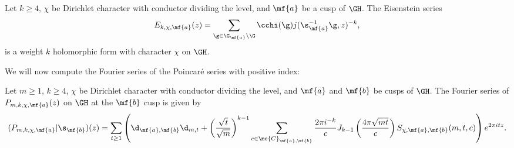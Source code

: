     \begin{theorem}
      Let $k \ge 4$, $\chi$ be Dirichlet character with conductor dividing the level, and $\mf{a}$ be a cusp of $\GH$. The Eisenstein series
      \[
        E_{k,\chi,\mf{a}}(z) = \sum_{\g \in \G_{\mf{a}}\backslash\G}\cchi(\g)j(\s_{\mf{a}}^{-1}\g,z)^{-k},
      \]
      is a weight $k$ holomorphic form with character $\chi$ on $\GH$.
    \end{theorem}

    We will now compute the Fourier series of the Poincar\'e series with positive index:

     \begin{proposition}\label{prop:Fourier_series_holomorphic}
      Let $m \ge 1$, $k \ge 4$, $\chi$ be Dirichlet character with conductor dividing the level, and $\mf{a}$ and $\mf{b}$ be cusps of $\GH$. The Fourier series of $P_{m,k,\chi,\mf{a}}(z)$ on $\GH$ at the $\mf{b}$ cusp is given by
      \[
        (P_{m,k,\chi,\mf{a}}|\s_{\mf{b}})(z) = \sum_{t \ge 1}\left(\d_{\mf{a},\mf{b}}\d_{m,t}+\left(\frac{\sqrt{t}}{\sqrt{m}}\right)^{k-1}\sum_{c \in \mc{C}_{\mf{a},\mf{b}}}\frac{2\pi i^{-k}}{c}J_{k-1}\left(\frac{4\pi\sqrt{mt}}{c}\right)S_{\chi,\mf{a},\mf{b}}(m,t,c)\right)e^{2\pi itz}.
      \]
    \end{proposition}

